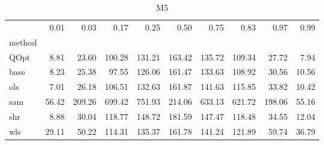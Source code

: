 \begin{table}
\caption{M5}
\label{ }
\begin{tabular}{lrrrrrrrrr}
\toprule
 & 0.01 & 0.03 & 0.17 & 0.25 & 0.50 & 0.75 & 0.83 & 0.97 & 0.99 \\
method &  &  &  &  &  &  &  &  &  \\
\midrule
QOpt & 8.81 & 23.60 & 100.28 & 131.21 & 163.42 & 135.72 & 109.34 & 27.72 & 7.94 \\
base & 8.23 & 25.38 & 97.55 & 126.06 & 161.47 & 133.63 & 108.92 & 30.56 & 10.56 \\
ols & 7.01 & 26.18 & 106.51 & 132.63 & 161.87 & 141.63 & 115.85 & 33.82 & 10.42 \\
sam & 56.42 & 209.26 & 699.42 & 751.93 & 214.06 & 633.13 & 621.72 & 198.06 & 55.16 \\
shr & 8.88 & 30.04 & 118.77 & 148.72 & 181.59 & 147.47 & 118.48 & 34.55 & 12.04 \\
wls & 29.11 & 50.22 & 114.31 & 135.37 & 161.78 & 141.24 & 121.89 & 59.74 & 36.79 \\
\bottomrule
\end{tabular}
\end{table}
